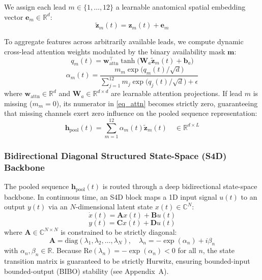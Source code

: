 \documentclass[journal]{IEEEtran}
\begin{document}
We assign each lead $m \in \{1, \dots, 12\}$ a learnable anatomical spatial embedding vector $\mathbf{e}_m \in \mathbb{R}^d$:
\begin{equation}
    \tilde{\mathbf{z}}_m(t) = \mathbf{z}_m(t) + \mathbf{e}_m
\end{equation}

To aggregate features across arbitrarily available leads, we compute dynamic cross-lead attention weights modulated by the binary availability mask $\mathbf{m}$:
\begin{equation}
    q_m(t) = \mathbf{w}_{\text{attn}}^\top \tanh\big(\mathbf{W}_a \tilde{\mathbf{z}}_m(t) + \mathbf{b}_a\big)
\end{equation}
\begin{equation}
    \alpha_m(t) = \frac{m_m \exp\big(q_m(t) / \sqrt{d}\big)}{\sum_{j=1}^{12} m_j \exp\big(q_j(t) / \sqrt{d}\big) + \epsilon}
    \label{eq_attn}
\end{equation}
where $\mathbf{w}_{\text{attn}} \in \mathbb{R}^d$ and $\mathbf{W}_a \in \mathbb{R}^{d \times d}$ are learnable attention projections. If lead $m$ is missing ($m_m = 0$), its numerator in \eqref{eq_attn} becomes strictly zero, guaranteeing that missing channels exert zero influence on the pooled sequence representation:
\begin{equation}
    \mathbf{h}_{\text{pool}}(t) = \sum_{m=1}^{12} \alpha_m(t) \tilde{\mathbf{z}}_m(t) \quad \in \mathbb{R}^{d \times L}
\end{equation}

\subsubsection{Bidirectional Diagonal Structured State-Space (S4D) Backbone}
The pooled sequence $\mathbf{h}_{\text{pool}}(t)$ is routed through a deep bidirectional state-space backbone. In continuous time, an S4D block maps a 1D input signal $u(t)$ to an output $y(t)$ via an $N$-dimensional latent state $x(t) \in \mathbb{C}^N$:
\begin{equation}
    \dot{x}(t) = \mathbf{A} x(t) + \mathbf{B} u(t)
\end{equation}
\begin{equation}
    y(t) = \mathbf{C} x(t) + \mathbf{D} u(t)
\end{equation}
where $\mathbf{A} \in \mathbb{C}^{N \times N}$ is constrained to be strictly diagonal:
\begin{equation}
    \mathbf{A} = \text{diag}(\lambda_1, \lambda_2, \dots, \lambda_N), \quad \lambda_n = -\exp(\alpha_n) + i \beta_n
\end{equation}
with $\alpha_n, \beta_n \in \mathbb{R}$. Because $\text{Re}(\lambda_n) = -\exp(\alpha_n) < 0$ for all $n$, the state transition matrix is guaranteed to be strictly Hurwitz, ensuring bounded-input bounded-output (BIBO) stability (see Appendix~A).
\end{document}
